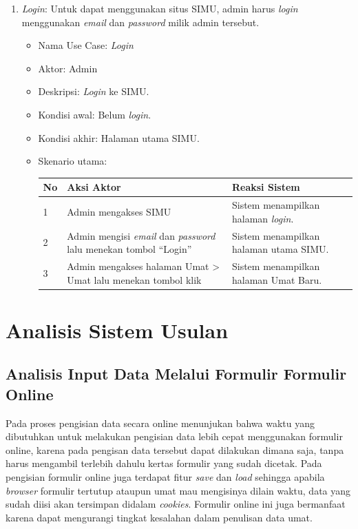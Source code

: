 \begin{enumerate}
	\item \textit{Login}: Untuk dapat menggunakan situs SIMU, admin harus \textit{login} menggunakan \textit{email} dan \textit{password} milik admin tersebut.
	\begin{itemize}
		\item Nama Use Case: \textit{Login}
		\item Aktor: Admin
		\item Deskripsi: \textit{Login} ke SIMU.
		\item Kondisi awal: Belum \textit{login}.
		\item Kondisi akhir: Halaman utama SIMU.
		\item Skenario utama:
		\begin{table}[h!]
			\centering
			\label{}
			\begin{tabular}{ | m{0.5cm} | m{7cm}| m{6cm} | } 
				\hline
				No & Aksi Aktor & Reaksi Sistem \\ 
				\hline
				1 & Admin mengakses SIMU & Sistem menampilkan halaman \textit{login}.
				\\ 
				\hline
				2 & Admin mengisi \textit{email} dan \textit{password} lalu menekan tombol ``Login'' & Sistem menampilkan halaman utama SIMU.
				\\ 
				\hline
				3 & Admin mengakses halaman Umat > Umat lalu menekan tombol klik & Sistem menampilkan halaman Umat Baru.
				\\ 
				\hline
			\end{tabular}
		\end{table}
	\end{itemize}
\end{enumerate}
\newpage


\section{Analisis Sistem Usulan}
\label{sec:analisisSistemusulan}

\subsection{Analisis Input Data Melalui Formulir Formulir Online}

Pada proses pengisian data secara online menunjukan bahwa waktu yang dibutuhkan untuk melakukan pengisian data lebih cepat menggunakan formulir online, karena pada pengisan data tersebut dapat dilakukan dimana saja, tanpa harus mengambil terlebih dahulu kertas formulir yang sudah dicetak. Pada pengisian formulir online juga terdapat fitur \textit{save} dan \textit{load} sehingga apabila \textit{browser} formulir tertutup ataupun umat mau mengisinya dilain waktu, data yang sudah diisi akan tersimpan didalam \textit{cookies}. Formulir online ini juga bermanfaat karena dapat mengurangi tingkat kesalahan dalam penulisan data umat.

